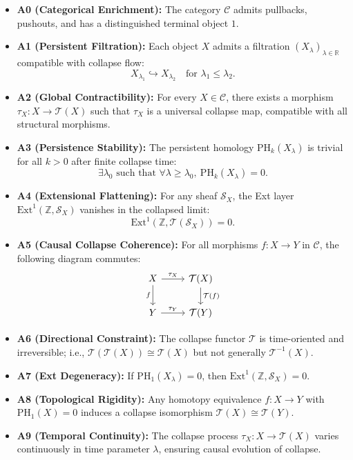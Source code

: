 \documentclass[11pt]{article}
\begin{document}
\begin{itemize}
    \item \textbf{A0 (Categorical Enrichment):} The category $\mathcal{C}$ admits pullbacks, pushouts, and has a distinguished terminal object $1$.

    \item \textbf{A1 (Persistent Filtration):} Each object $X$ admits a filtration $(X_\lambda)_{\lambda \in \mathbb{R}}$ compatible with collapse flow:
    \[
    X_{\lambda_1} \hookrightarrow X_{\lambda_2} \quad \text{for } \lambda_1 \leq \lambda_2.
    \]

    \item \textbf{A2 (Global Contractibility):} For every $X \in \mathcal{C}$, there exists a morphism $\tau_X : X \rightarrow \mathcal{T}(X)$  
    such that $\tau_X$ is a universal collapse map, compatible with all structural morphisms.

    \item \textbf{A3 (Persistence Stability):} The persistent homology $\mathrm{PH}_k(X_\lambda)$ is trivial for all $k > 0$ after finite collapse time:
    \[
    \exists \lambda_0 \text{ such that } \forall \lambda \geq \lambda_0,\ \mathrm{PH}_k(X_\lambda) = 0.
    \]

    \item \textbf{A4 (Extensional Flattening):} For any sheaf $\mathcal{S}_X$, the Ext layer $\mathrm{Ext}^1(\mathbb{Z}, \mathcal{S}_X)$  
    vanishes in the collapsed limit:
    \[
    \mathrm{Ext}^1(\mathbb{Z}, \mathcal{T}(\mathcal{S}_X)) = 0.
    \]

    \item \textbf{A5 (Causal Collapse Coherence):} For all morphisms $f: X \rightarrow Y$ in $\mathcal{C}$, the following diagram commutes:
    \[
    \begin{tikzcd}
    X \arrow[r, "\tau_X"] \arrow[d, "f"'] & \mathcal{T}(X) \arrow[d, "\mathcal{T}(f)"] \\
    Y \arrow[r, "\tau_Y"] & \mathcal{T}(Y)
    \end{tikzcd}
    \]

    \item \textbf{A6 (Directional Constraint):} The collapse functor $\mathcal{T}$ is time-oriented and irreversible;  
    i.e., $\mathcal{T}(\mathcal{T}(X)) \cong \mathcal{T}(X)$ but not generally $\mathcal{T}^{-1}(X)$.

    \item \textbf{A7 (Ext Degeneracy):} If $\mathrm{PH}_1(X_\lambda) = 0$, then $\mathrm{Ext}^1(\mathbb{Z}, \mathcal{S}_X) = 0$.

    \item \textbf{A8 (Topological Rigidity):} Any homotopy equivalence $f: X \to Y$ with $\mathrm{PH}_1(X) = 0$  
    induces a collapse isomorphism $\mathcal{T}(X) \cong \mathcal{T}(Y)$.

    \item \textbf{A9 (Temporal Continuity):} The collapse process $\tau_X: X \rightarrow \mathcal{T}(X)$ varies continuously in time parameter $\lambda$,  
    ensuring causal evolution of collapse.
\end{itemize}
\end{document}
